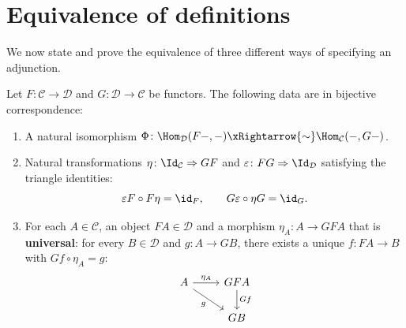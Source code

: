 \section{Equivalence of definitions}\label{sec:adj-equivalence}

We now state and prove the equivalence of three different ways
of specifying an adjunction.

\begin{theorem}%
\label{thm:adj-equiv-defs}
Let $F\colon\mathcal{C}\to\mathcal{D}$ and
$G\colon\mathcal{D}\to\mathcal{C}$ be functors.
The following data are in bijective correspondence:
\begin{enumerate}[label=\textbf{(\Alph*)}]
\item\label{item:adj-hom}
    A natural isomorphism
    $\Phi\colon\Hom_\mathcal{D}(F-,-)\xRightarrow{\sim}\Hom_\mathcal{C}(-,G-)$.

\item\label{item:adj-unit-counit}
    Natural transformations $\eta\colon\Id_\mathcal{C}\Rightarrow GF$
    and $\varepsilon\colon FG\Rightarrow\Id_\mathcal{D}$ satisfying
    the triangle identities:
    \[
        \varepsilon F\circ F\eta = \id_F,
        \qquad
        G\varepsilon\circ\eta G = \id_G.
    \]

\item\label{item:adj-universal}
    For each $A\in\mathcal{C}$, an object $FA\in\mathcal{D}$ and
    a morphism $\eta_A\colon A\to GFA$ that is \textbf{universal}:
    for every $B\in\mathcal{D}$ and $g\colon A\to GB$, there exists
    a unique $f\colon FA\to B$ with $Gf\circ\eta_A = g$:
    \[
    \begin{tikzcd}
    A \arrow[r, "\eta_A"] \arrow[dr, "g"'] & GFA \arrow[d, "Gf"] \\
    & GB
    \end{tikzcd}
    \]
\end{enumerate}
\end{theorem}

